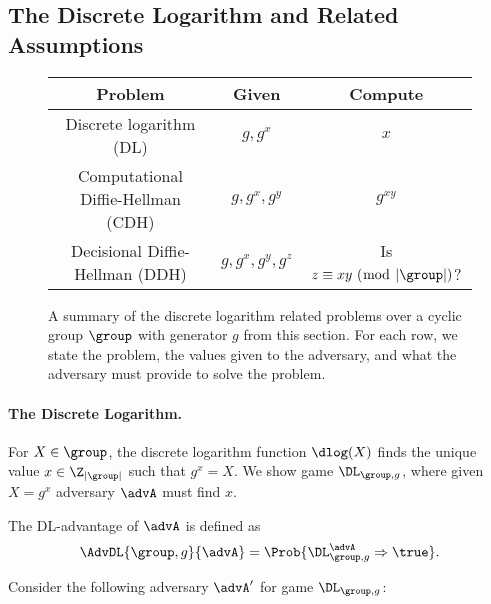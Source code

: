 \subsection{The Discrete Logarithm and Related Assumptions}

\begin{figure}
	\center
	\begin{tabular}{|c|c|c|}
		\hline
		Problem & Given & Compute \\
		\hline \hline
		Discrete logarithm (DL) & $g, g^x$ & $x$ \\
		\hline
		Computational Diffie-Hellman (CDH) & $g,g^x,g^y$ & $g^{xy}$ \\
		\hline
		Decisional Diffie-Hellman (DDH) & $g, g^x, g^y, g^z$ & Is $z \equiv xy\ (\bmod \ |\group|)$? \\
		\hline
	\end{tabular}
	\caption{A summary of the discrete logarithm related problems over a cyclic group $\group$ with generator $g$ from this section. For each row, we state the problem, the values given to the adversary, and what the adversary must provide to solve the problem.}
	\label{fig:DL}
\end{figure}

\paragraph{The Discrete Logarithm.} For $X \in \group$, the discrete logarithm function $\dlog(X)$ finds the unique value $x \in \Z_{|\group|}$ such that $g^x = X$. We show game $\DL_{\group, g}$, where given $X = g^x$ adversary $\advA$ must find $x$. 

\begin{center}
\end{center}

The DL-advantage of $\advA$ is defined as 
\begin{equation*}
\AdvDL{\group, g}{\advA} = \Prob{\DL^\advA_{\group, g}\Rightarrow\true}.
\end{equation*}

Consider the following adversary $\advA'$ for game $\DL_{\group, g}$:

\begin{center}
\end{center}

